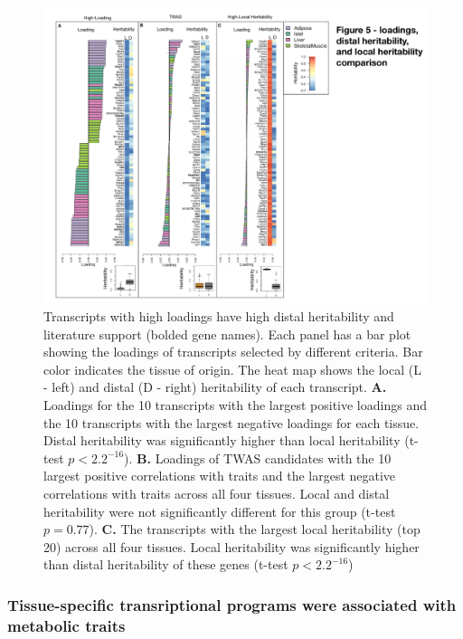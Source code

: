 \documentclass[
]{article}
\begin{document}
\pagebreak

\begin{figure}[ht!]
\includegraphics[width=\textwidth]{Figures/Fig5_loading_heritability.pdf} 
\caption{Transcripts with high loadings have high distal heritability 
and literature support (bolded gene names). Each panel has a bar plot 
showing the loadings of transcripts selected by different criteria. Bar color indicates the 
tissue of origin. The heat map shows the local (L - left) and distal 
(D - right) heritability of each transcript. \textbf{A.} Loadings for 
the 10 transcripts with the largest positive loadings and the 10 
transcripts with the largest negative loadings for each tissue. 
Distal heritability was significantly higher than local heritability 
(t-test $p < 2.2^{-16}$). \textbf{B.} Loadings of TWAS candidates 
with the 10 largest positive correlations with traits and the largest 
negative correlations with traits across all four tissues. Local and 
distal heritability were not significantly different for this group 
(t-test $p = 0.77$). \textbf{C.} The transcripts with the largest 
local heritability (top 20) across all four tissues. Local heritability 
was significantly higher than distal heritability of these genes (t-test 
$p < 2.2^{-16}$)
}
\label{fig:loading_heritability}
\end{figure}

\subsubsection{Tissue-specific transriptional programs were associated
with metabolic
traits}\label{tissue-specific-transriptional-programs-were-associated-with-metabolic-traits}
\end{document}
